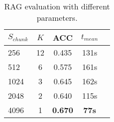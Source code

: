 \begin{table*}[ht!]
    \centering
    \begin{tabular}{lc|ccc}
      \toprule
      $S_{chunk}$ & $K$ & ACC & $t_{mean}$ \\
      \midrule
      256  & 12 & 0.435 & 131s \\
      512  & 6  & 0.575 & 161s \\
      1024 & 3  & 0.645 & 162s \\
      2048 & 2  & 0.640 & 115s \\
      4096 & 1  & \textbf{0.670} & \textbf{77s} \\
      \bottomrule
    \end{tabular}
    \caption{RAG evaluation with different parameters.}
    \label{tab:RAG_evaluation}
  \end{table*}
  